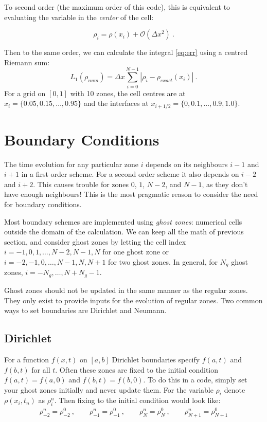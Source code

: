 \documentclass{article}
\begin{document}
To second order (the maximum order of this code), this is equivalent to evaluating the variable in the \emph{center} of the cell:

\begin{equation}
	\rho_i = \rho\left(x_i \right) + \mathcal{O}\left(\Delta x^2\right)\ .
\end{equation}

Then to the same order, we can calculate the integral \eqref{eq:err} using a centred Riemann sum:
\begin{equation}
	L_1(\rho_{num}) = \Delta x \sum_{i=0}^{N-1} \left| \rho_i - \rho_{exact}\left(x_i\right)\right| \ .
\end{equation}
For a grid on $[0,1]$ with 10 zones, the cell centres are at $x_i = \{ 0.05, 0.15, \dots, 0.95\}$ and the interfaces at $x_{i+1/2} = \{0,0.1,\dots, 0.9, 1.0 \}$.

\section{Boundary Conditions}

The time evolution for any particular zone $i$ depends on its neighbours $i-1$ and $i+1$ in a first order scheme.  For a second order scheme it also depends on $i-2$ and $i+2$.  This causes trouble for zones $0$, $1$, $N-2$, and $N-1$, as they don't have enough neighbours!  This is the most pragmatic reason to consider the need for boundary conditions.

Most boundary schemes are implemented using \emph{ghost zones}: numerical cells outside the domain of the calculation.  We can keep all the math of previous section, and consider ghost zones by letting the cell index $i = -1,0,1,\dots,N-2,N-1,N$ for one ghost zone or $i = -2,-1,0,\dots,N-1,N,N+1$ for two ghost zones.  In general, for $N_g$ ghost zones, $i=-N_g, \dots, N+N_g-1$.

Ghost zones should not be updated in the same manner as the regular zones. They only exist to provide inputs for the evolution of regular zones. Two common ways to set boundaries are Dirichlet and Neumann.

\subsection{Dirichlet}

For a function $f(x,t)$ on $[a,b]$ Dirichlet boundaries specify $f(a,t)$ and $f(b,t)$ for all $t$. Often these zones are fixed to the initial condition $f(a,t) =f(a,0)$ and $f(b,t) = f(b,0)$.  To do this in a code, simply set your ghost zones initially and never update them.  For the variable $\rho_i$ denote $\rho(x_i,t_n)$ as $\rho_i^n$.  Then fixing to the initial condition would look like:
\begin{align}
	\rho_{-2}^n = \rho_{-2}^0\ , \qquad \rho_{-1}^n = \rho_{-1}^0\ , \qquad \rho_{N}^n = \rho_{N}^0\ , \qquad \rho_{N+1}^n = \rho_{N+1}^0
\end{align}
\end{document}
